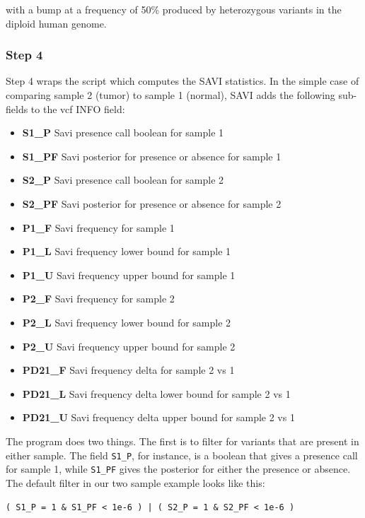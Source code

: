 \documentclass[letterpaper,14pt]{memoir}
\begin{document}
\noindent with a bump at a frequency of 50\% produced by heterozygous variants in the diploid human genome.

\subsubsection{Step 4}

Step 4 wraps the script which computes the SAVI statistics.
In the simple case of comparing sample 2 (tumor) to sample 1 (normal), SAVI adds the following sub-fields to the vcf INFO field:

\begin{itemize}
\tightlist
\item
  \textbf{S1\_P} Savi presence call boolean for sample 1
\item
  \textbf{S1\_PF} Savi posterior for presence or absence for sample 1
\item
  \textbf{S2\_P} Savi presence call boolean for sample 2
\item
  \textbf{S2\_PF} Savi posterior for presence or absence for sample 2
\item
  \textbf{P1\_F} Savi frequency for sample 1
\item
  \textbf{P1\_L} Savi frequency lower bound for sample 1
\item
  \textbf{P1\_U} Savi frequency upper bound for sample 1
\item
  \textbf{P2\_F} Savi frequency for sample 2
\item
  \textbf{P2\_L} Savi frequency lower bound for sample 2
\item
  \textbf{P2\_U} Savi frequency upper bound for sample 2
\item
  \textbf{PD21\_F} Savi frequency delta for sample 2 vs 1
\item
  \textbf{PD21\_L} Savi frequency delta lower bound for sample 2 vs 1
\item
  \textbf{PD21\_U} Savi frequency delta upper bound for sample 2 vs 1
\end{itemize}

\noindent The program does two things. The first is to filter for variants that are present in either sample. The field \texttt{S1\_P}, for instance, is a boolean that gives a presence call for sample 1, while \texttt{S1\_PF} gives the posterior for either the presence or absence.
The default filter in our two sample example looks like this:

\begin{center}
\texttt{( S1\_P = 1 \& S1\_PF < 1e-6 ) | ( S2\_P = 1 \& S2\_PF < 1e-6 )}
\end{center}
\end{document}
